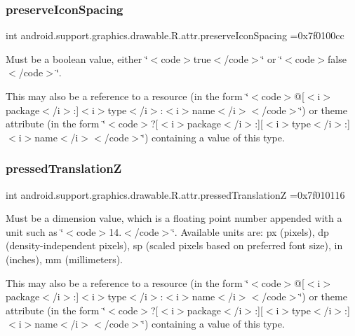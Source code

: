 \subsubsection{\texorpdfstring{preserve\+Icon\+Spacing}{preserveIconSpacing}}
{\footnotesize\ttfamily int android.\+support.\+graphics.\+drawable.\+R.\+attr.\+preserve\+Icon\+Spacing =0x7f0100cc\hspace{0.3cm}{\ttfamily [static]}}

Must be a boolean value, either \char`\"{}$<$code$>$true$<$/code$>$\char`\"{} or \char`\"{}$<$code$>$false$<$/code$>$\char`\"{}. 

This may also be a reference to a resource (in the form \char`\"{}$<$code$>$@\mbox{[}$<$i$>$package$<$/i$>$\+:\mbox{]}$<$i$>$type$<$/i$>$\+:$<$i$>$name$<$/i$>$$<$/code$>$\char`\"{}) or theme attribute (in the form \char`\"{}$<$code$>$?\mbox{[}$<$i$>$package$<$/i$>$\+:\mbox{]}\mbox{[}$<$i$>$type$<$/i$>$\+:\mbox{]}$<$i$>$name$<$/i$>$$<$/code$>$\char`\"{}) containing a value of this type. \mbox{\label{classandroid_1_1support_1_1graphics_1_1drawable_1_1R_1_1attr_a8f73ab043faed5a5f0177339bce27433}} 
\subsubsection{\texorpdfstring{pressed\+TranslationZ}{pressedTranslationZ}}
{\footnotesize\ttfamily int android.\+support.\+graphics.\+drawable.\+R.\+attr.\+pressed\+TranslationZ =0x7f010116\hspace{0.3cm}{\ttfamily [static]}}

Must be a dimension value, which is a floating point number appended with a unit such as \char`\"{}$<$code$>$14.\+5sp$<$/code$>$\char`\"{}. Available units are\+: px (pixels), dp (density-\/independent pixels), sp (scaled pixels based on preferred font size), in (inches), mm (millimeters). 

This may also be a reference to a resource (in the form \char`\"{}$<$code$>$@\mbox{[}$<$i$>$package$<$/i$>$\+:\mbox{]}$<$i$>$type$<$/i$>$\+:$<$i$>$name$<$/i$>$$<$/code$>$\char`\"{}) or theme attribute (in the form \char`\"{}$<$code$>$?\mbox{[}$<$i$>$package$<$/i$>$\+:\mbox{]}\mbox{[}$<$i$>$type$<$/i$>$\+:\mbox{]}$<$i$>$name$<$/i$>$$<$/code$>$\char`\"{}) containing a value of this type. \mbox{\label{classandroid_1_1support_1_1graphics_1_1drawable_1_1R_1_1attr_a6a73a127b6301f534a66a8dd597193c5}} 
